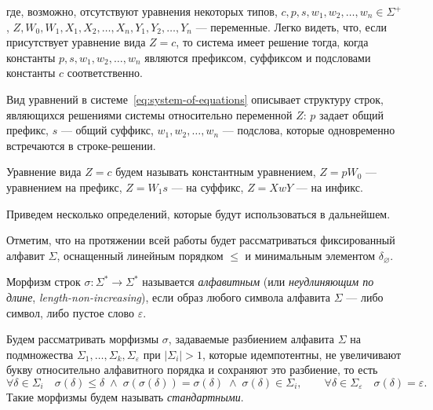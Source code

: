 \documentclass[fontsize=14pt]{scrartcl}
\begin{document}
где, возможно, отсутствуют уравнения некоторых типов, $c, p, s, w_1, w_2, \ldots, w_n \in \Sigma^+$, $Z, W_0, W_1, X_1, X_2, \ldots, X_n, Y_1, Y_2, \ldots, Y_n$ --- переменные. Легко видеть, что, если присутствует уравнение вида $Z = c$, 
то система имеет решение тогда, когда константы $p, s, w_1, w_2, \ldots, w_n$ являются префиксом, 
суффиксом и подсловами константы $c$ соответственно.

Вид уравнений в системе~\ref{eq:system-of-equations} описывает структуру строк, являющихся решениями системы относительно переменной $Z$:
$p$ задает общий префикс, $s$ --- общий суффикс, $w_1, w_2, \ldots, w_n$ --- подслова, которые одновременно встречаются в строке-решении.

Уравнение вида $Z = c$ будем называть константным уравнением, $Z = p W_0$ --- уравнением на префикс, $Z = W_1 s$ --- на суффикс,
$Z = X w Y$ --- на инфикс.



Приведем несколько определений, которые будут использоваться в дальнейшем.

Отметим, что на протяжении всей работы будет рассматриваться фиксированный алфавит $\Sigma$, оснащенный линейным порядком $\leq$ и 
минимальным элементом $\delta_\varnothing$.

\begin{Definition}
Морфизм строк $\sigma \colon \Sigma^* \to \Sigma^*$ называется \emph{алфавитным} (или \emph{неудлиняющим по длине}, \emph{length-non-increasing}), если образ любого символа алфавита $\Sigma$ --- либо символ, либо пустое слово $\varepsilon$.
\end{Definition}

\begin{Definition}
Будем рассматривать морфизмы $\sigma$, задаваемые разбиением алфавита $\Sigma$ на подмножества $\Sigma_1, \ldots, \Sigma_k, \Sigma_\varepsilon$ при $|\Sigma_i| > 1$, 
которые идемпотентны, не увеличивают букву относительно алфавитного порядка и сохраняют это разбиение, то есть
\[
  \forall \delta \in \Sigma_i \quad
  \sigma(\delta) \leq \delta \;\land\; \sigma(\sigma(\delta)) = \sigma(\delta) \;\land\; \sigma(\delta) \in \Sigma_i,
  \qquad
  \forall \delta \in \Sigma_\varepsilon \quad \sigma(\delta) = \varepsilon .
\]
Такие морфизмы будем называть \emph{стандартными}.
\end{Definition}
\end{document}
